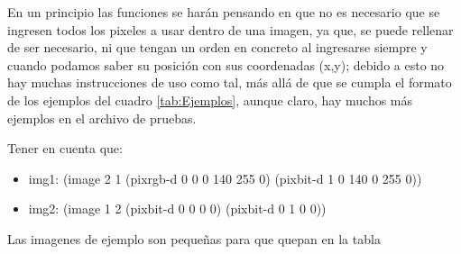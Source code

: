 En un principio las funciones se harán pensando en que no es necesario que se ingresen todos 
los pixeles a usar dentro de una imagen, ya que, se puede rellenar de ser necesario, ni que 
tengan un orden en concreto al ingresarse siempre y cuando podamos saber su posición con sus coordenadas 
(x,y); debido a esto no hay muchas instrucciones de uso como tal, más allá de que se cumpla el formato 
de los ejemplos del cuadro \ref{tab:Ejemplos}, aunque claro, hay muchos más ejemplos en el archivo de pruebas.

Tener en cuenta que:
\begin{itemize}
    \item img1: (image 2 1 (pixrgb-d 0 0 0 140 255 0) (pixbit-d 1 0 140 0 255 0))
    \item img2: (image 1 2 (pixbit-d 0 0 0 0) (pixbit-d 0 1 0 0))
\end{itemize}
Las imagenes de ejemplo son pequeñas para que quepan en la tabla